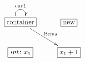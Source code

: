 $\xymatrix{
  \fbox{container} \ar@(ul, ur)^{var1} \ar[dr]^{items} & \fbox{new} \\
  \fbox{$\mathit{int}\colon x_1$} & \fbox{$x_1 + 1$}
}$
